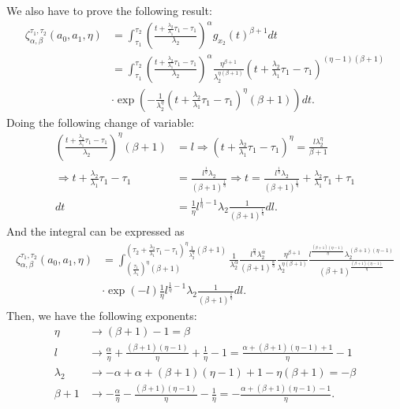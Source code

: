 \documentclass{article}
\begin{document}
We also have to prove the following result:
\begin{align*}
\zeta_{\alpha,\beta}^{\tau_1,\tau_2}\left(a_0,a_1,\eta\right)&=\int_{\tau_1}^{\tau_2}\left(\frac{t+\frac{\lambda_2}{\lambda_1}\tau_1-\tau_1}{\lambda_2} \right)^{\alpha}g_{x_2}(t)^{\beta+1}dt
\\
&=\int_{\tau_1}^{\tau_2}\left(\frac{t+\frac{\lambda_2}{\lambda_1}\tau_1-\tau_1}{\lambda_2} \right)^{\alpha} \frac{\eta^{\beta+1}}{\lambda_2^{\eta(\beta+1)}} \left(t+\frac{\lambda_2}{\lambda_1}\tau_1-\tau_1\right)^{(\eta-1)(\beta+1)}
\\
& \cdot \exp\left(-\frac{1}{\lambda_2^{\eta}}\left(t+\frac{\lambda_2}{\lambda_1}\tau_1-\tau_1\right)^{\eta}(\beta+1)\right)dt.
\end{align*}
Doing the following change of variable:
\begin{align*}
\left( \frac{t+\frac{\lambda_2}{\lambda_1}\tau_1-\tau_1}{\lambda_2}\right)^{\eta} (\beta+1)&= l \Rightarrow \left(t+\frac{\lambda_2}{\lambda_1}\tau_1-\tau_1\right)^{\eta}=\frac{l \lambda_2 ^{\eta}}{\beta+1}
\\
\Rightarrow  t+\frac{\lambda_2}{\lambda_1}\tau_1-\tau_1&=\frac{l^{\frac{1}{\eta}} \lambda_2}{(\beta+1)^{\frac{1}{\eta}}} \Rightarrow
 t=\frac{l^{\frac{1}{\eta}} \lambda_2}{(\beta+1)^{\frac{1}{\eta}}}+\frac{\lambda_2}{\lambda_1}\tau_1+\tau_1
 \\
 dt&=\frac{1}{\eta}l^{\frac{1}{\eta}-1}\lambda_2\frac{1}{(\beta+1)^{\frac{1}{\eta}}}dl.
\end{align*}
And the integral can be expressed as
\begin{align*}
\zeta_{\alpha,\beta}^{\tau_1,\tau_2}\left(a_0,a_1,\eta\right)&=\int_{\left(\frac{\tau_1}{\lambda_1}\right)^{\eta}(\beta+1)}^{\left(\tau_2+\frac{\lambda_2}{\lambda_1}\tau_1-\tau_1\right)^{\eta}\frac{1}{\lambda_2^{\eta}}(\beta+1)}
\frac{1}{\lambda_2^{\alpha}} \frac{l^{\frac{\alpha}{\eta}}\lambda_2^{\alpha}}{(\beta+1)^{\frac{\alpha}{\eta}}}\frac{\eta^{\beta+1}}{\lambda_2^{\eta(\beta+1)}}\frac{l^{\frac{(\beta+1)(\eta-1)}{\eta}}\lambda_2^{(\beta+1)(\eta-1)}}{(\beta+1)^{\frac{(\beta+1)(\eta-1)}{\eta}}}
\\
& \cdot \exp\left(-l\right)\frac{1}{\eta} l^{\frac{1}{\eta}-1}\lambda_2 \frac{1}{(\beta+1)^{\frac{1}{\eta}}}dl.
\end{align*}
Then, we have the following exponents:
\begin{align*}
\eta & \rightarrow (\beta+1)-1=\beta
\\
l  &\rightarrow \frac{\alpha}{\eta} +\frac{(\beta+1)(\eta-1)}{\eta} + \frac{1}{\eta} -1 = \frac{\alpha+(\beta+1)(\eta-1)+1}{\eta}-1
\\
\lambda_2 & \rightarrow -\alpha+\alpha+(\beta+1)(\eta-1)+1-\eta(\beta+1)=-\beta
\\
\beta+1 & \rightarrow -\frac{\alpha}{\eta}- \frac{(\beta+1)(\eta-1)}{\eta}-\frac{1}{\eta}=-\frac{\alpha+(\beta+1)(\eta-1)-1}{\eta}.
\end{align*}
\end{document}
